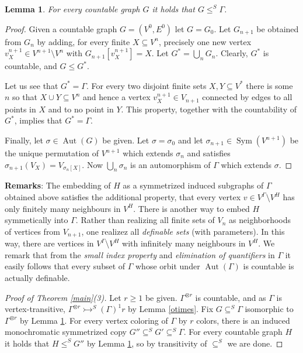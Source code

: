 \documentclass[11pt]{amsart}
\newcommand{\ars}{\rightarrowtail}
\newcommand{\sm}{\setminus}
\newcommand{\su}{\subseteq}
\newcommand{\aut}{\operatorname{Aut}}
\newcommand{\sym}{\operatorname{Sym}}
\newtheorem{lemma}[theorem]{Lemma}
\begin{document}
\begin{lemma}\label{inGamma}
For every countable graph $G$ it holds that $G\le ^S \Gamma$.
 \end{lemma}

\begin{proof}
Given a countable graph $G=(V^0, E^0)$ let $G=G_0$. Let $G_{n+1}$ be
obtained from $G_n$ by adding, for every finite $X\su V^n$, precisely
one new vertex $v^{n+1}_X\in V^{n+1}\sm V^n$ with $G_{n+1}[v^{n+1}_X]=X$. Let
$G^*=\bigcup_n G_n$. Clearly, $G^*$ is countable, and $G\le G^*$.  

Let us see that $G^*=\Gamma$. For every
two disjoint finite sets $X,Y\su V^*$ there is some $n$ so that $X\cup
Y\su V^n$ and hence a vertex $v_X^{n+1}\in V_{n+1}$ connected by edges
to all points in $X$ and to no point in $Y$. This property, together with  
the countability of $G^*$,
implies that $G^*=\Gamma$.

Finally, let $\sigma\in \aut(G)$ be given. Let $\sigma=\sigma_0$ and
let $\sigma_{n+1}\in \sym(V^{n+1})$ be the unique permutation of
$V^{n+1}$ which extends $\sigma_n$ and satisfies
$\sigma_{n+1}(V_X)=V_{\sigma_n[X]}$. Now $\bigcup_n \sigma_n$ is an
automorphism of $\Gamma$ which extends $\sigma$. 
\end{proof}

\noindent \textbf{Remarks}: The embedding of $H$ as a symmetrized
induced subgraphs of $\Gamma$ obtained above satisfies the additional
property, that every vertex $v\in V^\Gamma\sm V^H$ has only finitely
many neighbours in $V^H$. There is
another way to embed $H$ symmetically into
$\Gamma$. Rather than realizing all finite sets of $V_n$ as
neighborhoods of vertices from $V_{n+1}$, one realizez all
\emph{definable sets} (with parameters). In this way, there are
vertices in $V^\Gamma\sm V^H$ with infinitely many neighbours in
$V^H$.  We remark that from the
\emph{small index property} \cite{HHLS} and \emph{elimination of
  quantifiers} in $\Gamma$ it easily follows that every subset of
$\Gamma$ whose orbit under $\aut(\Gamma)$ is countable is actually
definable.

\begin{proof}[Proof of Theorem \ref{main}(3)]
  Let $r\ge 1$ be given. $\Gamma^{\otimes r}$ is countable, and as
  $\Gamma$ is vertex-transitive, $\Gamma^{\otimes r}\ars^S(\Gamma)^1r$
  by Lemma \ref{otimes}.  Fix $G\su^S\Gamma$ isomorphic to
  $\Gamma^{\otimes r}$ by Lemma \ref{inGamma}. For every vertex
  coloring of $\Gamma$ by $r$ colors, there is an induced
  monochromatic symmetrized copy $G''\su^S G'\su^S \Gamma$. For every
  countable graph $H$ it holds that $H\le^S G''$ by Lemma
  \ref{inGamma}, so by transitivity of $\su^S$ we are done.
\end{proof}
\end{document}
